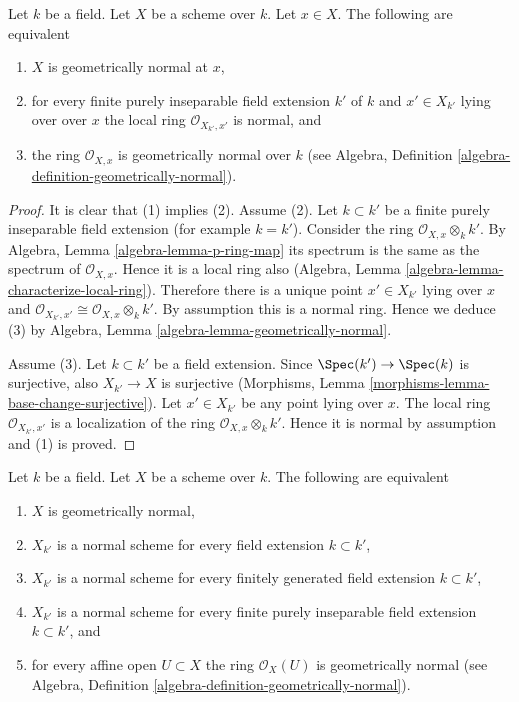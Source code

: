 \begin{lemma}
\label{lemma-geometrically-normal-at-point}
Let $k$ be a field.
Let $X$ be a scheme over $k$.
Let $x \in X$.
The following are equivalent
\begin{enumerate}
\item $X$ is geometrically normal at $x$,
\item for every finite purely inseparable field extension $k'$ of $k$
and $x' \in X_{k'}$ lying over over $x$ the local ring
$\mathcal{O}_{X_{k'}, x'}$ is normal, and
\item the ring $\mathcal{O}_{X, x}$ is geometrically
normal over $k$ (see
Algebra, Definition \ref{algebra-definition-geometrically-normal}).
\end{enumerate}
\end{lemma}

\begin{proof}
It is clear that (1) implies (2). Assume (2). Let $k \subset k'$ be a finite
purely inseparable field extension (for example $k = k'$). Consider the ring
$\mathcal{O}_{X, x} \otimes_k k'$.
By Algebra, Lemma \ref{algebra-lemma-p-ring-map}
its spectrum is the same as the spectrum of $\mathcal{O}_{X, x}$.
Hence it is a local ring also
(Algebra, Lemma \ref{algebra-lemma-characterize-local-ring}).
Therefore there is a unique point $x' \in X_{k'}$ lying over $x$
and $\mathcal{O}_{X_{k'}, x'} \cong \mathcal{O}_{X, x} \otimes_k k'$.
By assumption this is a normal ring. Hence we deduce (3) by
Algebra, Lemma
\ref{algebra-lemma-geometrically-normal}.

\medskip\noindent
Assume (3). Let $k \subset k'$ be a field extension. Since
$\Spec(k') \to \Spec(k)$ is surjective, also
$X_{k'} \to X$ is surjective
(Morphisms, Lemma \ref{morphisms-lemma-base-change-surjective}).
Let $x' \in X_{k'}$ be any point lying over $x$.
The local ring $\mathcal{O}_{X_{k'}, x'}$
is a localization of the ring $\mathcal{O}_{X, x} \otimes_k k'$.
Hence it is normal by assumption and (1) is proved.
\end{proof}

\begin{lemma}
\label{lemma-geometrically-normal}
Let $k$ be a field.
Let $X$ be a scheme over $k$.
The following are equivalent
\begin{enumerate}
\item $X$ is geometrically normal,
\item $X_{k'}$ is a normal scheme for every field extension $k \subset k'$,
\item $X_{k'}$ is a normal scheme for every finitely generated field
extension $k \subset k'$,
\item $X_{k'}$ is a normal scheme for every finite purely inseparable
field extension $k \subset k'$, and
\item for every affine open $U \subset X$ the ring $\mathcal{O}_X(U)$
is geometrically normal (see
Algebra, Definition \ref{algebra-definition-geometrically-normal}).
\end{enumerate}
\end{lemma}

